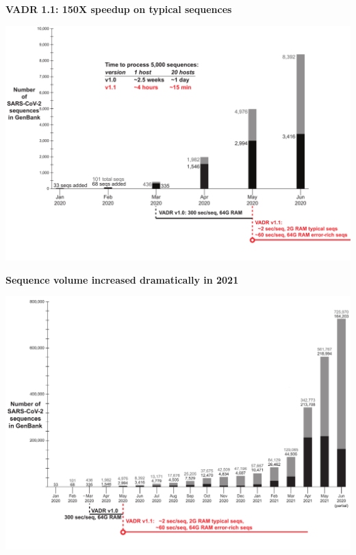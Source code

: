 \documentclass[landscape]{slides}
\begin{document}
\begin{slide}
\begin{center}
\large{\textbf{VADR 1.1: 150X speedup on typical sequences}}

\includegraphics[width=10.5in]{figs/sars-counts-jan2020-may2020-slide4}
\end{center}

\vfill
\end{slide}
\begin{slide}
\begin{center}
\textbf{Sequence volume increased dramatically in 2021}

\includegraphics[width=10.25in]{figs/sars-counts-jan2020-jun2021-slide1}
\end{center}

\vfill
\end{slide}
\end{document}
